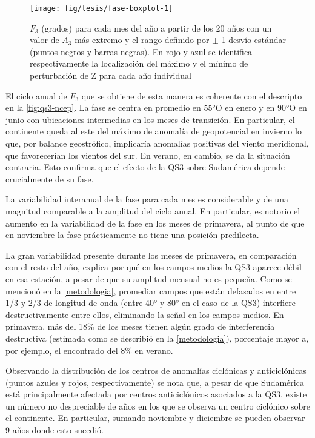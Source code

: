 \documentclass[spanish,a4paper,12pt,oneside]{book}
\begin{document}
\begin{landscape}\begin{figure}

{\centering \texttt{[image: fig/tesis/fase-boxplot-1]} 

}

\caption{$F_3$ (grados) para cada mes del año a partir de los 20 años con un valor de $A_3$ más extremo y el rango definido por $\pm$ 1 desvío estándar  (puntos negros y barras negras). En rojo y azul se identifica respectivamente la localización del máximo y el mínimo de perturbación de Z para cada año individual}\label{fig:fase-boxplot}
\end{figure}
\end{landscape}

El ciclo anual de \(F_3\) que se obtiene de esta manera es coherente con
el descripto en la \autoref{fig:qs3-ncep}. La fase se centra en promedio
en 55°O en enero y en 90°O en junio con ubicaciones intermedias en los
meses de transición. En particular, el continente queda al este del
máximo de anomalía de geopotencial en invierno lo que, por balance
geostrófico, implicaría anomalías positivas del viento meridional, que
favorecerían los vientos del sur. En verano, en cambio, se da la
situación contraria. Esto confirma que el efecto de la QS3 sobre
Sudamérica depende crucialmente de su fase.

La variabilidad interanual de la fase para cada mes es considerable y de
una magnitud comparable a la amplitud del ciclo anual. En particular, es
notorio el aumento en la variabilidad de la fase en los meses de
primavera, al punto de que en noviembre la fase prácticamente no tiene
una posición predilecta.

La gran variabilidad presente durante los meses de primavera, en
comparación con el resto del año, explica por qué en los campos medios
la QS3 aparece débil en esa estación, a pesar de que su amplitud mensual
no es pequeña. Como se mencionó en la \autoref{metodologia}, promediar
campos que están defasados en entre 1/3 y 2/3 de longitud de onda (entre
40° y 80° en el caso de la QS3) interfiere destructivamente entre ellos,
eliminando la señal en los campos medios. En primavera, más del 18\% de
los meses tienen algún grado de interferencia destructiva (estimada como
se describió en la \autoref{metodologia}), porcentaje mayor a, por
ejemplo, el encontrado del 8\% en verano.

Observando la distribución de los centros de anomalías ciclónicas y
anticiclónicas (puntos azules y rojos, respectivamente) se nota que, a
pesar de que Sudamérica está principalmente afectada por centros
anticiclónicos asociados a la QS3, existe un número no despreciable de
años en los que se observa un centro ciclónico sobre el continente. En
particular, sumando noviembre y diciembre se pueden observar 9 años
donde esto sucedió.
\end{document}
